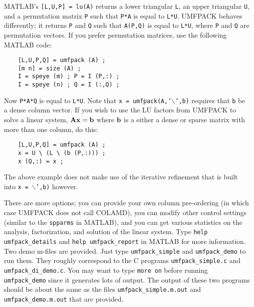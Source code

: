 MATLAB's {\tt [L,U,P] = lu(A)} returns a lower triangular {\tt L}, an upper
triangular {\tt U}, and a permutation matrix {\tt P} such that {\tt P*A} is
equal to {\tt L*U}.  UMFPACK behaves differently; it returns {\tt P} and {\tt Q}
such that {\tt A(P,Q)} is equal to {\tt L*U}, where {\tt P} and {\tt Q} are
permutation vectors.  If you prefer permutation matrices, use the following
MATLAB code:

{\footnotesize
\begin{verbatim}
    [L,U,P,Q] = umfpack (A) ;
    [m n] = size (A) ;
    I = speye (m) ; P = I (P,:) ;
    I = speye (n) ; Q = I (:,Q) ;
\end{verbatim}
}

Now {\tt P*A*Q} is equal to {\tt L*U}.  Note that
        {\tt x = umfpack(A,'}$\backslash${\tt ',b)}
requires that {\tt b} be a dense column vector.
If you wish to use the LU factors from UMFPACK to solve a
linear system, ${\bf{Ax}}={\bf{b}}$ where ${\bf{b}}$ is a either a dense or sparse
matrix with more than one column, do this:

{\footnotesize
\begin{verbatim}
    [L,U,P,Q] = umfpack (A) ;
    x = U \ (L \ (b (P,:))) ;
    x (Q,:) = x ;
\end{verbatim}
}

The above example does not make use of the iterative refinement
that is built into
        {\tt x = }$\backslash${\tt ',b)}
however.

There are more options; you can provide your own column pre-ordering (in which
case UMFPACK does not call COLAMD), you can modify other control settings
(similar to the {\tt spparms} in MATLAB), and you can get various statistics on
the analysis, factorization, and solution of the linear system.  Type
{\tt help umfpack\_details} and {\tt help umfpack\_report} in MATLAB for more
information.  Two demo m-files are provided.   Just type {\tt umfpack\_simple}
and {\tt umfpack\_demo} to run them.  They roughly correspond to the C programs
{\tt umfpack\_simple.c} and {\tt umfpack\_di\_demo.c}.  You may want to type
{\tt more on} before running {\tt umfpack\_demo} since it generates
lots of output.  The output of these two programs should be about the same
as the files {\tt umfpack\_simple.m.out} and {\tt umfpack\_demo.m.out}
that are provided.


